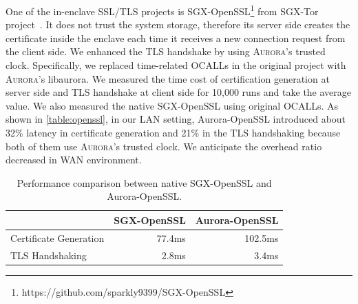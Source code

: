 One of the in-enclave SSL/TLS projects is SGX-OpenSSL\footnote{https://github.com/sparkly9399/SGX-OpenSSL} from SGX-Tor project~\cite{DBLP:conf/nsdi/KimHHKH17}. It does not trust the system storage, therefore its server side creates the certificate inside the enclave each time it receives a new connection request from the client side. We enhanced the TLS handshake by using \textsc{Aurora}'s trusted clock. Specifically, we replaced time-related OCALLs in the original project with \textsc{Aurora}'s libaurora. %
We measured the time cost of certification generation at server side and TLS handshake at client side for 10,000 runs and take the average value. We also measured the native SGX-OpenSSL using original OCALLs. As shown in \autoref{table:openssl}, in our LAN setting, Aurora-OpenSSL introduced about 32\% latency in certificate generation and 21\% in the TLS handshaking because both of them use \textsc{Aurora}'s trusted clock. We anticipate the overhead ratio decreased in WAN environment.

\begin{table}[t]
	\centering
	\caption{Performance comparison between native SGX-OpenSSL and Aurora-OpenSSL.}
	\label{table:openssl}
	\small
	\begin{tabular}{lrr}
		\toprule
		& SGX-OpenSSL & Aurora-OpenSSL \\
		\midrule
		Certificate Generation & 77.4ms & 102.5ms \\
		TLS Handshaking & 2.8ms & 3.4ms \\
		\bottomrule
	\end{tabular}
\end{table}

